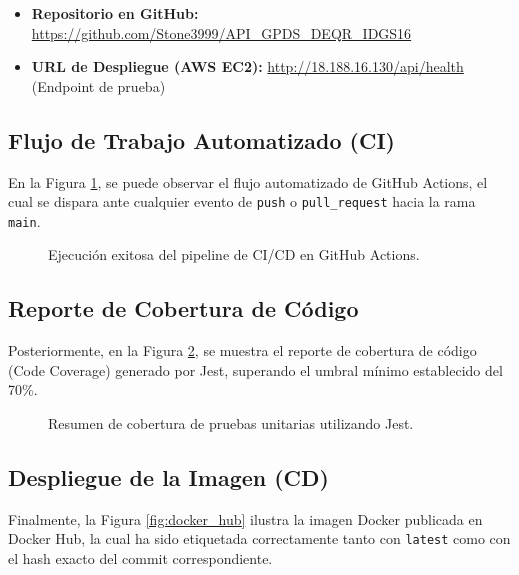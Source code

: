 \documentclass[12pt, letterpaper]{extarticle}
\begin{document}
\begin{itemize}
    \item \textbf{Repositorio en GitHub:} \url{https://github.com/Stone3999/API_GPDS_DEQR_IDGS16}
    \item \textbf{URL de Despliegue (AWS EC2):} \url{http://18.188.16.130/api/health} (Endpoint de prueba)
\end{itemize}

\subsection{Flujo de Trabajo Automatizado (CI)}
En la Figura \ref{fig:github_actions}, se puede observar el flujo automatizado de GitHub Actions, el cual se dispara ante cualquier evento de \texttt{push} o \texttt{pull\_request} hacia la rama \texttt{main}.

\begin{figure}[h]
    \centering
    \vspace{5cm} %
    \caption{Ejecución exitosa del pipeline de CI/CD en GitHub Actions.}
    \label{fig:github_actions}
\end{figure}

\subsection{Reporte de Cobertura de Código}
Posteriormente, en la Figura \ref{fig:code_coverage}, se muestra el reporte de cobertura de código (Code Coverage) generado por Jest, superando el umbral mínimo establecido del 70\%.

\begin{figure}[h]
    \centering
    \vspace{5cm} %
    \caption{Resumen de cobertura de pruebas unitarias utilizando Jest.}
    \label{fig:code_coverage}
\end{figure}

\subsection{Despliegue de la Imagen (CD)}
Finalmente, la Figura \ref{fig:docker_hub} ilustra la imagen Docker publicada en Docker Hub, la cual ha sido etiquetada correctamente tanto con \texttt{latest} como con el hash exacto del commit correspondiente.
\end{document}
